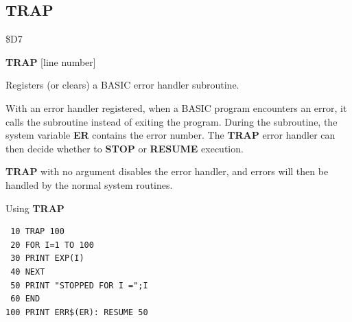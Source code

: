 \subsection{TRAP}
\begin{description}[leftmargin=2cm,style=nextline]
\item [Token:] \$D7
\item [Format:] {\bf TRAP} [line number]
\item [Usage:]  Registers (or clears) a BASIC error handler subroutine.

                With an error handler registered, when a BASIC program
                encounters an error, it calls the subroutine instead of
                exiting the program. During the subroutine, the system
                variable {\bf ER} contains the error number.
                The {\bf TRAP} error handler can then decide whether to {\bf
                STOP} or {\bf RESUME} execution.

                {\bf TRAP} with no argument disables the error handler, and
                errors will then be handled by the normal system routines.

\item [Example:] Using {\bf TRAP}
\begin{tcolorbox}[colback=black,coltext=white]
\verbatimfont{\codefont}
\begin{verbatim}
 10 TRAP 100
 20 FOR I=1 TO 100
 30 PRINT EXP(I)
 40 NEXT
 50 PRINT "STOPPED FOR I =";I
 60 END
100 PRINT ERR$(ER): RESUME 50
\end{verbatim}
\end{tcolorbox}
\end{description}


\newpage
